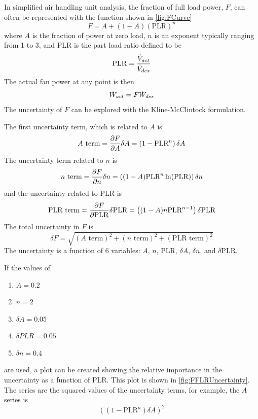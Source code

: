 In simplified air handling unit analysis, the fraction of full load
power, \(F\), can often be represented with the function shown in
\figref{} \ref{fig:FCurve}
\begin{equation}
    F = A + (1-A)( \text{PLR} )^{n}
\end{equation}
where \(A\) is the fraction of power at zero load, \(n\) is an exponent
typically ranging from 1 to 3, and PLR is the part load
ratio defined to be
\begin{equation}
    \text{PLR} = \frac{\dot{V}_{act}}{\dot{V}_{des}}
\end{equation}
The actual fan power at any point is then
\begin{equation}
    \dot{W}_{act}  = F \dot{W}_{des}
\end{equation}
The uncertainty of \(F\) can be explored with the Kline-McClintock
formulation.

The first uncertainty term, which is related to \(A\) is
\begin{equation}
A \text{ term} = \pdv{F}{A} \delta A = \left(1-\text{PLR}^n\right) \delta A
\end{equation}
The uncertainty term related to \(n\) is
\begin{equation}
    n \text{ term} = \pdv{F}{n} \delta n = \left((1-A) \text{PLR}^n \ln (\text{PLR})\right) \delta n
\end{equation}
and the uncertainty related to PLR is
\begin{equation}
    \text{PLR term} = \pdv{F}{ \text{PLR}} \delta \text{PLR} = \left((1-A) n \text{PLR}^{n-1}\right) \delta \text{PLR}
\end{equation}
The total uncertainty in \(F\) is
\begin{equation}
    \delta F = \sqrt{ \left(A \text{ term}\right)^{2} + \left(n \text{ term}\right)^{2} + \left( \text{PLR term}\right)^{2} }
\end{equation}
The uncertainty is a function of 6 variables: \(A\), \(n\), PLR, \(\delta A\), \(\delta n\), and \(\delta\)PLR.

If the values of
\begin{enumerate}
    \item \(A=0.2\)
    \item \(n=2\)
    \item \(\delta A = 0.05\)
    \item \(\delta PLR = 0.05\)
    \item \(\delta n = 0.4\)
\end{enumerate}
are used, a plot can be created showing the relative importance in the
uncertainty as a function of PLR. This plot is shown in \figref{}
\ref{fig:FFLRUncertainty}. The series are the squared values of the
uncertainty terms, for example, the \(A\) series is 
\begin{equation}
    \left(\left(1-\text{PLR}^n\right) \delta A\right)^{2}
\end{equation}

